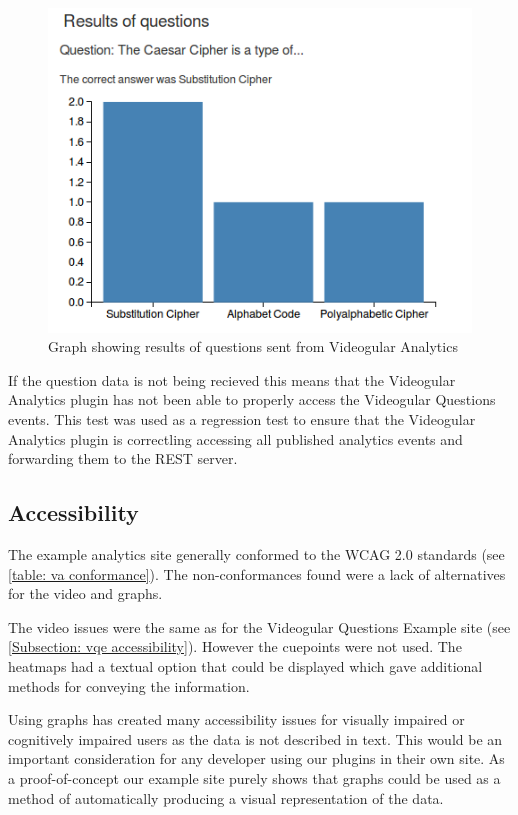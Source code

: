 \begin{figure}[h]
	\centering
		\includegraphics[scale=0.8]{../figures/analytics_graphs.png}
	\caption{\label{Figure:Analytics Question Graphs} Graph showing results of questions sent from Videogular Analytics}
\end{figure}

If the question data is not being recieved this means that the Videogular Analytics plugin has not been able to properly access the Videogular Questions events. This test was used as a regression test to ensure that the Videogular Analytics plugin is correctling accessing all published analytics events and forwarding them to the REST server.

\subsection{Accessibility}

The example analytics site generally conformed to the WCAG 2.0 standards (see \autoref{table: va conformance}). The non-conformances found were a lack of alternatives for the video and graphs.

The video issues were the same as for the Videogular Questions Example site (see \autoref{Subsection: vqe accessibility}). However the cuepoints were not used. The heatmaps had a textual option that could be displayed which gave additional methods for conveying the information.

Using graphs has created many accessibility issues for visually impaired or cognitively impaired users as the data is not described in text. This would be an important consideration for any developer using our plugins in their own site. As a proof-of-concept our example site purely shows that graphs could be used as a method of automatically producing a visual representation of the data.

